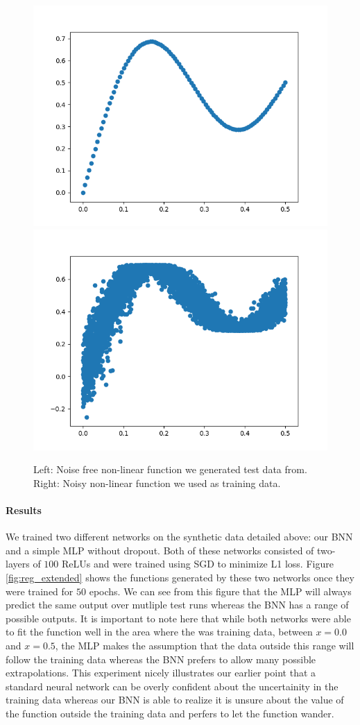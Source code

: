 \documentclass[11pt]{article}
\begin{document}
\begin{figure}
  \centering\includegraphics[width=.45\textwidth]{figures/regression_curve.png}
  \centering\includegraphics[width=.45\textwidth]{figures/regression_curve_with_noise.png}
  \caption{Left: Noise free non-linear function we generated test data from.
  Right: Noisy non-linear function we used as training data.}
  \label{fig:reg_syth_data}
\end{figure}

\paragraph{Results} 
We trained two different networks on the synthetic data detailed above: our BNN
and a simple MLP without dropout. Both of these networks consisted of two-
layers of $100$ ReLUs and were trained using SGD to minimize L1 loss. Figure
\ref{fig:reg_extended} shows the functions generated by these two networks
once they were trained for $50$ epochs. We can see from this figure that the
MLP will always predict the same output over mutliple test runs whereas the BNN
has a range of possible outputs. It is important to note here that while both 
networks were able to fit the function well in the area where the was training
data, between $x=0.0$ and $x=0.5$, the MLP makes the assumption that the 
data outside this range will follow the training data whereas the BNN prefers
to allow many possible extrapolations. This experiment nicely illustrates our 
earlier point that a standard neural network can be overly confident about 
the uncertainity in the training data whereas our BNN is able to realize it 
is unsure about the value of the function outside the training data and
perfers to let the function wander.
\end{document}
